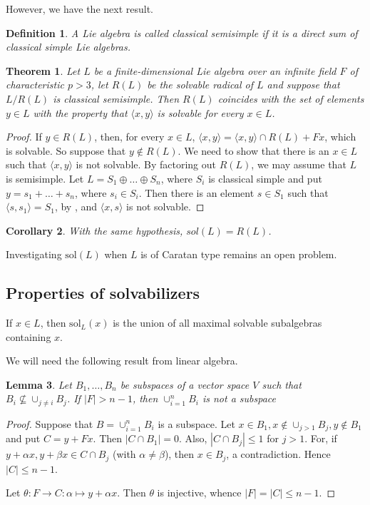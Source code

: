 \documentclass[11pt]{amsart}
\theoremstyle{plain}
\newtheorem{theorem}{Theorem}[section]
\newtheorem{corollary}[theorem]{Corollary}
\newtheorem{lemma}[theorem]{Lemma}
\newtheorem{definition}{Definition}[section]
\def\sol{\mathrm{sol}}
\begin{document}
However, we have the next result.

\begin{definition}
A Lie algebra is called {\it classical semisimple} if it is a direct sum of classical simple Lie algebras.    
\end{definition}

\begin{theorem} Let $L$ be a finite-dimensional Lie algebra over an infinite field $F$ of characteristic $p>3$, let $R(L)$ be the solvable radical of $L$ and suppose that $L/R(L)$ is classical semisimple. Then $R(L)$ coincides with the set of elements $y\in L$ with the property that $\langle x,y\rangle$ is solvable for every $x\in L$.
\end{theorem}
\begin{proof} If $y\in R(L)$, then, for every $x\in L$, $\langle x,y\rangle = \langle x,y\rangle\cap R(L) + Fx$, which is solvable. So suppose that $y\notin R(L)$. We need to show that there is an $x\in L$ such that $\langle x,y\rangle$ is not solvable. By factoring out $R(L)$, we may assume that $L$ is semisimple. Let $L=S_1\oplus \ldots \oplus S_n$, where $S_i$ is classical simple and put $y=s_1+ \ldots + s_n$, where $s_i\in S_i$. Then there is an element $s\in S_1$ such that $\langle s,s_1\rangle=S_1$, by \cite[Theorem B and section 1.2.2]{bois}, and $\langle x,s\rangle$ is not solvable.
\end{proof}

\begin{corollary}
 With the same hypothesis, $sol(L)=R(L)$.    
\end{corollary}

Investigating $\sol(L)$ when $L$ is of Caratan type remains an open problem.

\subsection*{Properties of solvabilizers}
If $x\in L$, then $\sol_L(x)$ is the union of all maximal solvable subalgebras containing $x$.
\par

We will need the following result from linear algebra.

\begin{lemma}\label{subspaces}  Let $B_1, \ldots, B_n$ be subspaces of a vector space $V$ such that $B_i\not\subseteq \cup_{j\neq i} B_j$. If $|F|>n-1$, then $\cup_{i=1}^nB_i$ is not a subspace
\end{lemma}
\begin{proof} Suppose that $B=\cup_{i=1}^nB_i$ is a subspace. Let $x\in B_1, x\notin \cup_{j>1}B_j,y\notin B_1$ and put $C=y+Fx$. Then $|C\cap B_1|=0$. Also, $|C\cap B_j|\leq 1$ for $j>1$. For, if $y+\alpha x, y+\beta x\in C\cap B_j$ (with $\alpha\neq \beta$), then $x\in B_j$, a contradiction.  Hence $|C|\leq n-1$.
\par

Let $\theta: F \rightarrow C: \alpha \mapsto y+\alpha x$. Then $\theta$ is injective, whence $|F|=|C|\leq n-1$.
\end{proof}
   
\end{document}
